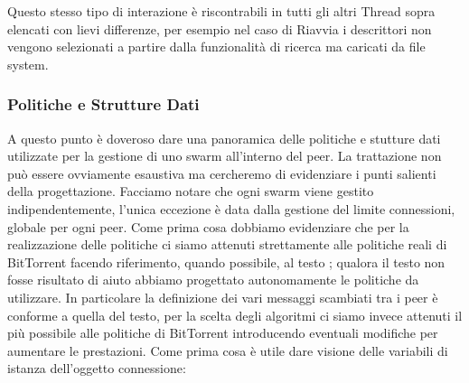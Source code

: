 
Questo stesso tipo di interazione \`e riscontrabili in tutti gli altri Thread sopra elencati con lievi differenze, per esempio nel caso di Riavvia i descrittori non vengono selezionati a partire dalla funzionalit\`a di ricerca ma caricati da file system.

\subsubsection{Politiche e Strutture Dati}

A questo punto \`e doveroso dare una panoramica delle politiche e stutture dati utilizzate per la gestione di uno swarm all'interno del peer. La trattazione non pu\`o essere ovviamente esaustiva ma cercheremo di evidenziare i punti salienti della progettazione.
Facciamo notare che ogni swarm viene gestito indipendentemente, l'unica eccezione \`e data dalla gestione del limite connessioni, globale per ogni peer.
Come prima cosa dobbiamo evidenziare che per la realizzazione delle politiche ci siamo attenuti strettamente alle politiche reali di BitTorrent facendo riferimento, quando possibile, al testo \citep{art:rif.1} 
; qualora il testo non fosse risultato di aiuto abbiamo progettato autonomamente le politiche da utilizzare.
In particolare la definizione dei vari messaggi scambiati tra i peer \`e conforme a quella del testo, per la scelta degli algoritmi ci siamo invece attenuti il pi\`u possibile alle politiche di BitTorrent introducendo eventuali modifiche per aumentare le prestazioni.
Come prima cosa \`e utile dare visione delle variabili di istanza dell'oggetto connessione:



